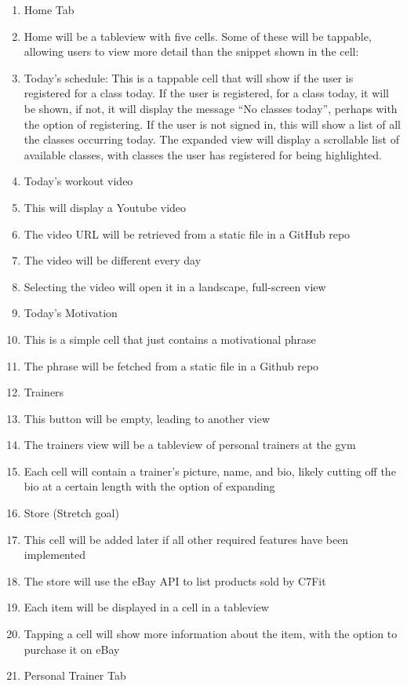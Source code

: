 \documentclass[letterpaper,10pt,titlepage]{article}
\begin{document}
\begin{enumerate}
\item Home Tab
\item Home will be a tableview with five cells. Some of these will be tappable, allowing users to view more detail than the snippet shown in the cell:
\item Today’s schedule: This is a tappable cell that will show if the user is registered for a class today. If the user is registered, for a class today, it will be shown, if not, it will display the message “No classes today”, perhaps with the option of registering. If the user is not signed in, this will show a list of all the classes occurring today. The expanded view will display a scrollable list of available classes, with classes the user has registered for being highlighted.
\item Today’s workout video
\item This will display a Youtube video
\item The video URL will be retrieved from a static file in a GitHub repo
\item The video will be different every day
\item Selecting the video will open it in a landscape, full-screen view
\item Today’s Motivation
\item This is a simple cell that just contains a motivational phrase
\item The phrase will be fetched from a static file in a Github repo
\item Trainers
\item This button will be empty, leading to another view
\item The trainers view will be a tableview of personal trainers at the gym
\item Each cell will contain a trainer’s picture, name, and bio, likely cutting off the bio at a certain length with the option of expanding
\item Store (Stretch goal)
\item This cell will be added later if all other required features have been implemented
\item The store will use the eBay API to list products sold by C7Fit
\item Each item will be displayed in a cell in a tableview
\item Tapping a cell will show more information about the item, with the option to purchase it on eBay
\item Personal Trainer Tab

\end{enumerate}
\end{document}
